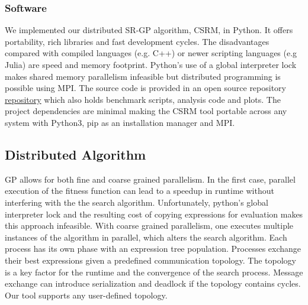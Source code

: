 \subsubsection{Software}
We implemented our distributed SR-GP algorithm, CSRM, in Python. It offers portability, rich libraries and fast development cycles. The disadvantages compared with compiled languages (e.g. C++) or newer scripting languages (e.g Julia) are speed and memory footprint.
Python's use of a global interpreter lock makes shared memory parallelism infeasible but distributed programming is possible using MPI.
The source code is provided in an open source repository \href{https://bitbucket.org/bcardoen/csrm}{repository} which also holds benchmark scripts, analysis code and plots. 
The project dependencies are minimal making the CSRM tool portable across any system with Python3, pip as an installation manager and MPI.


\subsection{Distributed Algorithm}
GP allows for both fine and coarse grained parallelism. In the first case, parallel execution of the fitness function can lead to a speedup in runtime without interfering with the the search algorithm. Unfortunately, python's global interpreter lock and the resulting cost of copying expressions for evaluation makes this approach infeasible. With coarse grained parallelism, one executes multiple instances of the algorithm in parallel, which alters the search algorithm. Each process has its own phase with an expression tree population. Processes exchange their best expressions given a predefined communication topology. The topology is a key factor for the runtime and the convergence of the search process. Message exchange can introduce serialization and deadlock if the topology contains cycles. Our tool supports any user-defined topology. 

